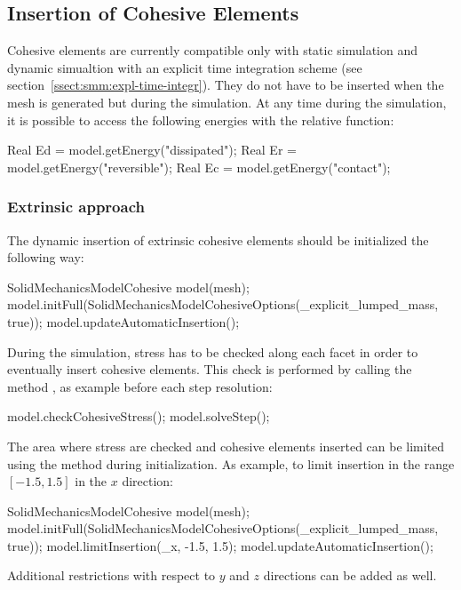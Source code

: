 \subsection{Insertion of Cohesive Elements}
Cohesive elements are currently compatible only with static simulation and dynamic simualtion with an explicit time integration scheme
(see section~\ref{ssect:smm:expl-time-integr}). They do not have to be
inserted when the mesh is generated but during the simulation. At any time during the simulation, it is possible to access the following energies with the relative function:
\begin{cpp}
  Real Ed = model.getEnergy("dissipated");
  Real Er = model.getEnergy("reversible");
  Real Ec = model.getEnergy("contact");
\end{cpp}

\subsubsection{Extrinsic approach}
The dynamic insertion of extrinsic cohesive elements should be initialized 
the following way:
\begin{cpp}
  SolidMechanicsModelCohesive model(mesh);
  model.initFull(SolidMechanicsModelCohesiveOptions(_explicit_lumped_mass, true));
  model.updateAutomaticInsertion();
\end{cpp} 
During the simulation, stress has to be checked along each facet in order to 
eventually insert cohesive elements.
This check is performed by calling the method , as 
example before each step resolution:
\begin{cpp}
  model.checkCohesiveStress();
  model.solveStep();
\end{cpp}
The area where stress are checked and cohesive elements inserted can be limited 
using the method  during initialization. As example, to 
limit insertion in the range $[-1.5, 1.5]$ in the $x$ direction: 
\begin{cpp}
  SolidMechanicsModelCohesive model(mesh);
  model.initFull(SolidMechanicsModelCohesiveOptions(_explicit_lumped_mass, true));
  model.limitInsertion(_x, -1.5, 1.5);
  model.updateAutomaticInsertion();
\end{cpp} 
Additional restrictions with respect to $y$ and $z$ directions can be added as well.

